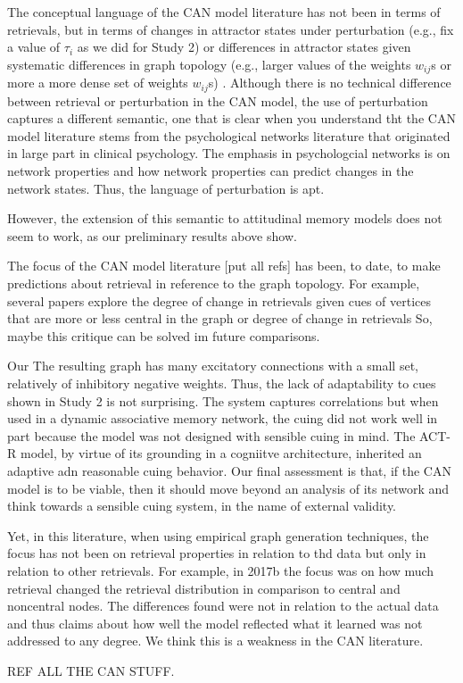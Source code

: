 The conceptual language of the CAN model literature has not been in terms of retrievals, but in terms of changes in attractor states under perturbation (e.g., fix a value of $\tau_i$ as we did for Study 2) or differences in attractor states given systematic differences in graph topology (e.g., larger values of the weights $w_{ij}$s or more a more dense set of weights $w_{ij}$s) \citep{dalege2016,DalegeMaas2017,DalegevanderMaas2020}. Although there is no technical difference between retrieval or perturbation in the CAN model, the use of perturbation captures a different semantic, one that is clear when you understand tht the CAN model literature stems from the psychological networks literature that originated in large part in clinical psychology.  The emphasis in psychologcial networks is on network properties and how network properties can predict changes in the network states. Thus, the language of perturbation is apt.  

However, the extension of this semantic to attitudinal memory models does not seem to work, as our preliminary results above show.        

The focus of the CAN model literature [put all refs] has been, to date, to make predictions about retrieval in reference to the graph topology.  For example, several papers explore the degree of change in retrievals given cues of vertices that are more or less central in the graph or degree of change in retrievals So, maybe this critique can be solved im future comparisons. 
   
Our The resulting graph has many excitatory connections with a small set, relatively of inhibitory negative weights. Thus, the lack of adaptability to cues shown in Study 2 is not surprising. The system captures correlations but when used in a dynamic associative memory network, the cuing did not work well in part because the model was not designed with sensible cuing in mind. The ACT-R model, by virtue of its grounding in a cogniitve architecture, inherited an adaptive adn reasonable cuing behavior.  Our final assessment is that, if the CAN model is to be viable, then it should move beyond an analysis of its network and think towards a sensible cuing system, in the name of external validity. 

Yet, in this literature, when using empirical graph generation techniques, the focus has not been on retrieval properties in relation to thd data but only in relation to other retrievals. For example, in 2017b the focus was on how much retrieval changed the retrieval distribution in comparison to central and noncentral nodes.  The differences found were not in relation to the actual data and thus claims about how well the model reflected what it learned was not addressed to any degree.  We think this is a weakness in the CAN literature.  

REF ALL THE CAN STUFF.